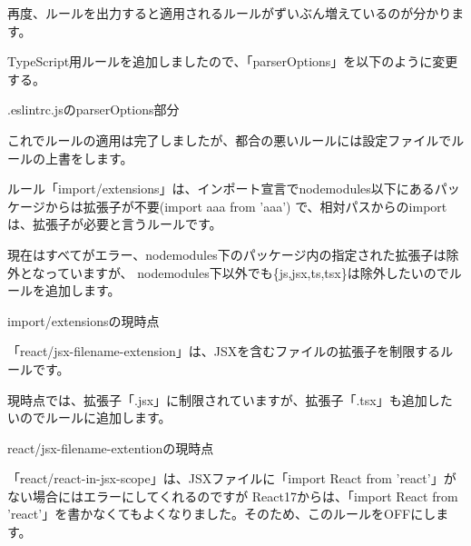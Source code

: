 再度、ルールを出力すると適用されるルールがずいぶん増えているのが分かります。

TypeScript用ルールを追加しましたので、「parserOptions」を以下のように変更する。

\def\startercodeblockfontsize{}
\begin{starterprogram}[]{.eslintrc.jsのparserOptions部分}\end{starterprogram}

これでルールの適用は完了しましたが、都合の悪いルールには設定ファイルでルールの上書をします。

\vspace*{\baselineskip}

ルール「import/extensions」は、インポート宣言でnode\textunderscore{}modules以下にあるパッケージからは拡張子が不要(import aaa from 'aaa')
で、相対パスからのimportは、拡張子が必要と言うルールです。

現在はすべてがエラー、node\textunderscore{}modules下のパッケージ内の指定された拡張子は除外となっていますが、
node\textunderscore{}modules下以外でも\{js,jsx,ts,tsx\}は除外したいのでルールを追加します。

\def\startercodeblockfontsize{}
\begin{starterprogram}[]{import/extensionsの現時点}\end{starterprogram}

「react/jsx{-}filename{-}extension」は、JSXを含むファイルの拡張子を制限するルールです。

現時点では、拡張子「.jsx」に制限されていますが、拡張子「.tsx」も追加したいのでルールに追加します。

\def\startercodeblockfontsize{}
\begin{starterprogram}[]{react/jsx{-}filename{-}extentionの現時点}\end{starterprogram}

「react/react{-}in{-}jsx{-}scope」は、JSXファイルに「import React from 'react'」がない場合にはエラーにしてくれるのですが
React17からは、「import React from 'react'」を書かなくてもよくなりました。そのため、このルールをOFFにします。

